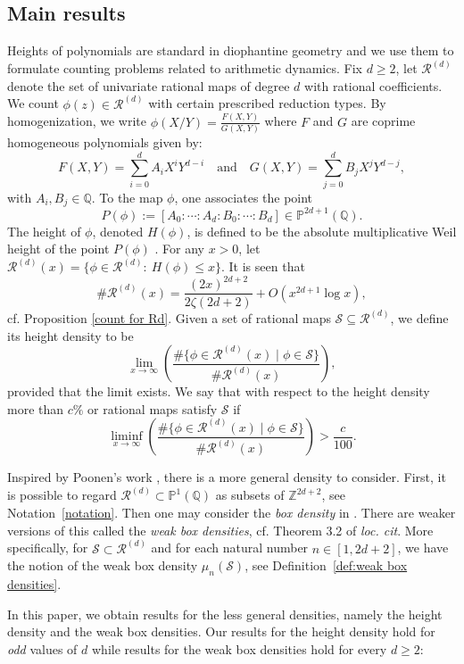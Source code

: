 \documentclass[12pt]{amsart}
\newcommand{\Z}{\mathbb{Z}}
\newcommand{\Q}{\mathbb{Q}}
\newcommand{\cR}{\mathcal{R}}
\newcommand{\cS}{\mathcal{S}}
\numberwithin{equation}{section}
\begin{document}
\subsection{Main results}
\par Heights of polynomials are standard in diophantine geometry and we use them to formulate counting problems related to arithmetic dynamics. Fix $d\geq 2$, let $\cR^{(d)}$ denote the
set of univariate rational maps of degree $d$ with rational coefficients.
We count $\phi(z)\in\cR^{(d)}$ with certain prescribed reduction types. By homogenization, we write $\phi(X/Y) = \frac{F(X, Y)}{G(X, Y)}$ where $F$ and $G$ are coprime homogeneous polynomials given by:
\[ 
F(X, Y) = \sum_{i=0}^d A_i X^i Y^{d-i} \quad \text{and} \quad G(X, Y) = \sum_{j=0}^d B_j X^j Y^{d-j}, 
\]
with $A_i, B_j \in \Q$. To the map $\phi$, one associates the point
\[ 
P(\phi) := [A_0 : \cdots : A_d : B_0 : \cdots : B_d] \in \mathbb{P}^{2d+1}(\Q). 
\]
The height of $\phi$, denoted $H(\phi)$, is defined to be the absolute multiplicative Weil height 
of the point $P(\phi)$ \cite[Chapter~1]{BomGub}.   
For any $x > 0$, let $\cR^{(d)}(x)=\{\phi\in\cR^{(d)}:\ H(\phi)\leq x\}$. It is seen that  \[\# \cR^{(d)}(x)= \frac{(2x)^{2d+2}}{2\zeta(2d+2)}+O\left( x^{2d+1}\log x\right),\] cf. Proposition \ref{count for Rd}. Given a set of rational maps $\cS\subseteq \cR^{(d)}$, we define its height density to be
\[\lim_{x\rightarrow\infty} \left(\frac{\#\{\phi\in \cR^{(d)}(x)\mid \phi\in \cS\}}{\# \cR^{(d)}(x)}\right),\]
provided that the limit exists. We say that with respect to the height density more than $c \%$ or rational maps satisfy $\cS$ if 
\[\liminf_{x\rightarrow\infty} \left(\frac{\#\{\phi\in \cR^{(d)}(x)\mid \phi\in \cS\}}{\# \cR^{(d)}(x)}\right)> \frac{c}{100}.\]

Inspired by Poonen's work \cite{Poonensquarefree}, there is a more general density to consider. First, it is possible to regard $\cR^{(d)}\subset \mathbb{P}^1(\Q)$ as subsets of $\Z^{2d+2}$, see Notation~\ref{notation}. Then one may consider the \emph{box density}  in 
\cite[p.~355]{Poonensquarefree}. There are weaker versions of this called the \emph{weak box densities}, cf. Theorem 3.2 of \emph{loc. cit}. More specifically, for $\mathcal{S}\subset \cR^{(d)}$ and for each
natural number $n\in [1,2d+2]$, we have the notion of the weak box density
$\mu_n(\mathcal{S})$, see Definition~\ref{def:weak box densities}.

In this paper, we obtain results for the less general densities, namely the height density and the weak box densities. Our results for the height density hold for \emph{odd} values of $d$ while results for the weak box densities hold for every $d\geq 2$:
\end{document}
